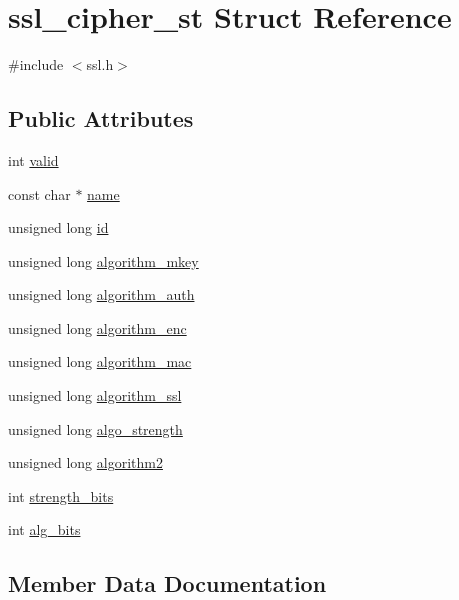\hypertarget{structssl__cipher__st}{}\section{ssl\+\_\+cipher\+\_\+st Struct Reference}
\label{structssl__cipher__st}


{\ttfamily \#include $<$ssl.\+h$>$}

\subsection*{Public Attributes}
\begin{DoxyCompactItemize}
\item 
int \hyperlink{structssl__cipher__st_aaf30c2f1483a5dfcf39a507efb2bacf7}{valid}
\item 
const char $\ast$ \hyperlink{structssl__cipher__st_a860dfffdc51bcbb32da3a3cbae116289}{name}
\item 
unsigned long \hyperlink{structssl__cipher__st_a65f32a2ae5d5696986ecd0195eb29450}{id}
\item 
unsigned long \hyperlink{structssl__cipher__st_ab29b842f135c00b0ae7e34fade97893f}{algorithm\+\_\+mkey}
\item 
unsigned long \hyperlink{structssl__cipher__st_a43b013ec206a5c93d2de55b0e2848cf7}{algorithm\+\_\+auth}
\item 
unsigned long \hyperlink{structssl__cipher__st_a3c592f9eb460fc02b91ce59485324546}{algorithm\+\_\+enc}
\item 
unsigned long \hyperlink{structssl__cipher__st_a6de1434594cf53106b54f0368bfbcf32}{algorithm\+\_\+mac}
\item 
unsigned long \hyperlink{structssl__cipher__st_ae343755fd0c58e74c5e03d41aaccae09}{algorithm\+\_\+ssl}
\item 
unsigned long \hyperlink{structssl__cipher__st_a7c6a3fecb3d246870ccb803260dc2b51}{algo\+\_\+strength}
\item 
unsigned long \hyperlink{structssl__cipher__st_aef80da6412c4e1fec8458c3c244d69e8}{algorithm2}
\item 
int \hyperlink{structssl__cipher__st_ae3a40fb67452514df7770e334a99c32d}{strength\+\_\+bits}
\item 
int \hyperlink{structssl__cipher__st_a451f084cd7c875897f5986a35a482628}{alg\+\_\+bits}
\end{DoxyCompactItemize}


\subsection{Member Data Documentation}

